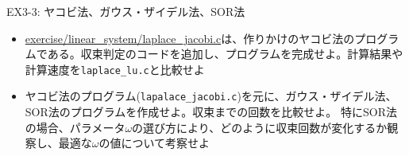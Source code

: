 \begin{frame}[t,fragile]{EX3-3: ヤコビ法、ガウス・ザイデル法、SOR法}
  \begin{itemize}
  \item[3-3-1] \href{https://github.com/todo-group/computer-experiments/exercise/blob/master/linear_system/laplace_jacobi.c}{exercise/linear\_system/laplace\_jacobi.c}は、作りかけのヤコビ法のプログラムである。収束判定のコードを追加し、プログラムを完成せよ。計算結果や計算速度を{\tt laplace\_lu.c}と比較せよ
  \item[3-3-2] ヤコビ法のプログラム({\tt lapalace\_jacobi.c})を元に、ガウス・ザイデル法、SOR法のプログラムを作成せよ。収束までの回数を比較せよ。
特にSOR法の場合、パラメータ$\omega$の選び方により、どのように収束回数が変化するか観察し、最適な$\omega$の値について考察せよ
  \end{itemize}
\end{frame}
